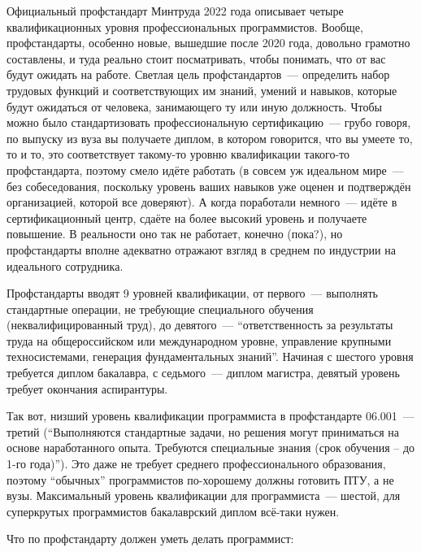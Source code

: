 \documentclass{../../text-style}
\begin{document}
Официальный профстандарт Минтруда 2022 года описывает четыре квалификационных уровня профессиональных программистов. Вообще, профстандарты, особенно новые, вышедшие после 2020 года, довольно грамотно составлены, и туда реально стоит посматривать, чтобы понимать, что от вас будут ожидать на работе. Светлая цель профстандартов~--- определить набор трудовых функций и соответствующих им знаний, умений и навыков, которые будут ожидаться от человека, занимающего ту или иную должность. Чтобы можно было стандартизовать профессиональную сертификацию~--- грубо говоря, по выпуску из вуза вы получаете диплом, в котором говорится, что вы умеете то, то и то, это соответствует такому-то уровню квалификации такого-то профстандарта, поэтому смело идёте работать (в совсем уж идеальном мире~--- без собеседования, поскольку уровень ваших навыков уже оценен и подтверждён организацией, которой все доверяют). А когда поработали немного~--- идёте в сертификационный центр, сдаёте на более высокий уровень и получаете повышение. В реальности оно так не работает, конечно (пока?), но профстандарты вполне адекватно отражают взгляд в среднем по индустрии на идеального сотрудника.

Профстандарты вводят 9 уровней квалификации, от первого~--- выполнять стандартные операции, не требующие специального обучения (неквалифицированный труд), до девятого~--- \enquote{ответственность за результаты труда на общероссийском или международном уровне, управление крупными техносистемами, генерация фундаментальных знаний}. Начиная с шестого уровня требуется диплом бакалавра, с седьмого~--- диплом магистра, девятый уровень требует окончания аспирантуры. 

Так вот, низший уровень квалификации программиста в профстандарте 06.001~--- третий (\enquote{Выполняются стандартные задачи, но решения могут приниматься на основе наработанного опыта. Требуются специальные знания (срок обучения – до 1-го года)}). Это даже не требует среднего профессионального образования, поэтому \enquote{обычных} программистов по-хорошему должны готовить ПТУ, а не вузы. Максимальный уровень квалификации для программиста~--- шестой, для суперкрутых программистов бакалаврский диплом всё-таки нужен.

Что по профстандарту должен уметь делать программист:
\end{document}
